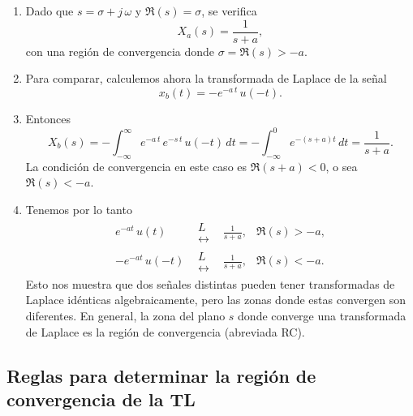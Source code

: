 \begin{enumerate}
\item Dado que $s = \sigma + j \, \omega$ y $\Re{(s)} = \sigma$, se verifica
\begin{equation}
        X_{a}(s) = \frac{1}{s+a}, 
\end{equation}
con una regi\'{o}n de convergencia donde $\sigma = \Re{(s)} > -a$.

\item Para comparar, calculemos ahora la transformada de Laplace de la se\~{n}al
\begin{equation}
        x_{b}(t) = -e^{-a \, t} \, u (-t).
\end{equation}

\item Entonces
\begin{equation}
  X_{b}(s) = 
  -\int_{-\infty}^{\infty} e^{-a \, t} \, e^{-s \, t} \, u(-t) \, dt = 
   -\int_{-\infty}^{0} e^{-(s+a) t} \, dt = \frac{1}{s+a}.
\end{equation}
La condici\'{o}n de convergencia en este caso es $\Re{(s+a)} < 0$, o sea $\Re{(s)} < -a$.

\item Tenemos por lo tanto
\begin{equation}
        \begin{array}{cccc}
    e^{-a t} \, u(t) & \begin{array}{c} L \\ \leftrightarrow \end{array} & \frac{1}{s+a}, & \Re{(s)} > -a, \\
   -e^{-a t} \, u(-t) & \begin{array}{c} L \\ \leftrightarrow \end{array} & \frac{1}{s+a}, & \Re{(s)} < -a.
        \end{array}
\end{equation}
Esto nos muestra que dos se\~{n}ales distintas pueden tener transformadas de Laplace 
id\'{e}nticas algebraicamente, pero las zonas donde estas convergen son diferentes. 
En general, la zona del plano $s$ donde converge una transformada de Laplace es la regi\'{o}n de 
convergencia (abreviada RC).

\end{enumerate}

\subsection{Reglas para determinar la regi\'{o}n de convergencia de la TL}

